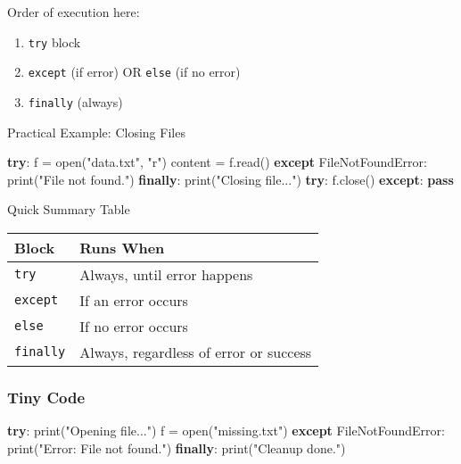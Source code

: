 \documentclass[
  letterpaper,
  DIV=11,
  numbers=noendperiod]{scrreprt}
\newenvironment{Shaded}{\begin{snugshade}}{\end{snugshade}}
\newcommand{\BuiltInTok}[1]{\textcolor[rgb]{0.00,0.23,0.31}{#1}}
\newcommand{\ControlFlowTok}[1]{\textcolor[rgb]{0.00,0.23,0.31}{\textbf{#1}}}
\newcommand{\NormalTok}[1]{\textcolor[rgb]{0.00,0.23,0.31}{#1}}
\newcommand{\OperatorTok}[1]{\textcolor[rgb]{0.37,0.37,0.37}{#1}}
\newcommand{\PreprocessorTok}[1]{\textcolor[rgb]{0.68,0.00,0.00}{#1}}
\newcommand{\StringTok}[1]{\textcolor[rgb]{0.13,0.47,0.30}{#1}}
\providecommand{\tightlist}{%
  \setlength{\itemsep}{0pt}\setlength{\parskip}{0pt}}
\begin{document}
Order of execution here:

\begin{enumerate}
\def\labelenumi{\arabic{enumi}.}
\tightlist
\item
  \texttt{try} block
\item
  \texttt{except} (if error) OR \texttt{else} (if no error)
\item
  \texttt{finally} (always)
\end{enumerate}

Practical Example: Closing Files

\begin{Shaded}
\begin{Highlighting}[]
\ControlFlowTok{try}\NormalTok{:}
\NormalTok{    f }\OperatorTok{=} \BuiltInTok{open}\NormalTok{(}\StringTok{"data.txt"}\NormalTok{, }\StringTok{"r"}\NormalTok{)}
\NormalTok{    content }\OperatorTok{=}\NormalTok{ f.read()}
\ControlFlowTok{except} \PreprocessorTok{FileNotFoundError}\NormalTok{:}
    \BuiltInTok{print}\NormalTok{(}\StringTok{"File not found."}\NormalTok{)}
\ControlFlowTok{finally}\NormalTok{:}
    \BuiltInTok{print}\NormalTok{(}\StringTok{"Closing file..."}\NormalTok{)}
    \ControlFlowTok{try}\NormalTok{:}
\NormalTok{        f.close()}
    \ControlFlowTok{except}\NormalTok{:}
        \ControlFlowTok{pass}
\end{Highlighting}
\end{Shaded}

Quick Summary Table

\begin{longtable}[]{@{}ll@{}}
\toprule\noalign{}
Block & Runs When \\
\midrule\noalign{}
\endhead
\bottomrule\noalign{}
\endlastfoot
\texttt{try} & Always, until error happens \\
\texttt{except} & If an error occurs \\
\texttt{else} & If no error occurs \\
\texttt{finally} & Always, regardless of error or success \\
\end{longtable}

\subsubsection{Tiny Code}\label{tiny-code-75}

\begin{Shaded}
\begin{Highlighting}[]
\ControlFlowTok{try}\NormalTok{:}
    \BuiltInTok{print}\NormalTok{(}\StringTok{"Opening file..."}\NormalTok{)}
\NormalTok{    f }\OperatorTok{=} \BuiltInTok{open}\NormalTok{(}\StringTok{"missing.txt"}\NormalTok{)}
\ControlFlowTok{except} \PreprocessorTok{FileNotFoundError}\NormalTok{:}
    \BuiltInTok{print}\NormalTok{(}\StringTok{"Error: File not found."}\NormalTok{)}
\ControlFlowTok{finally}\NormalTok{:}
    \BuiltInTok{print}\NormalTok{(}\StringTok{"Cleanup done."}\NormalTok{)}
\end{Highlighting}
\end{Shaded}
\end{document}
